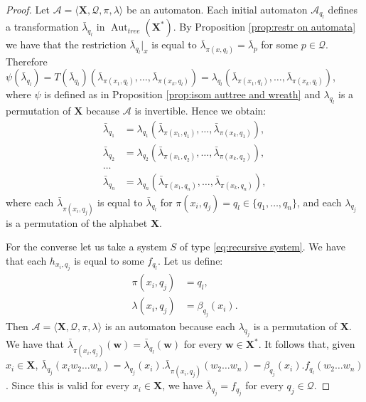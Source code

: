 \documentclass[mat1]{fmfdeloTS2.0}
\newcommand{\word}{\mathbf}				%
\newcommand{\abece}{\mathbf{X}}			%
\newcommand{\fslovar}{\mathbf{X^*}}		%
\newcommand{\auto}{\mathcal}			%
\newcommand{\QQ}{\mathcal{Q}}			%
\newcommand{\LAMBDA}{\bar{\lambda}}			%
\DeclareMathOperator{\aut}{\mathrm{Aut}}		%
\begin{document}
\begin{proof}
Let $\auto{A}=\langle\abece,\QQ,\pi,\lambda\rangle$ be an automaton. Each initial automaton $\auto{A}_{q_l}$ defines a transformation $\LAMBDA_{q_l}$ in $\aut_{tree}(\fslovar)$. By Proposition \autoref{prop:restr on automata} we have that the restriction $\LAMBDA_{q_l}|_x$ is equal to $\LAMBDA_{\pi(x,q_l)}=\LAMBDA_p$ for some $p\in\QQ$. Therefore $\psi(\LAMBDA_{q_l})=T(\LAMBDA_{q_l})(\LAMBDA_{\pi(x_1,q_l)},\ldots,\LAMBDA_{\pi(x_k,q_l)})=\lambda_{q_l}(\LAMBDA_{\pi(x_1,q_l)},\ldots,\LAMBDA_{\pi(x_k,q_l)})$, where $\psi$ is defined as in Proposition \autoref{prop:isom auttree and wreath} and $\lambda_{q_l}$ is a permutation of $\abece$ because $\auto{A}$ is invertible. Hence we obtain:
\begin{equation}\label{eq:auto wreath}
\begin{split}
\LAMBDA_{q_1}&=\lambda_{q_1}(\LAMBDA_{\pi(x_1,q_1)},\ldots,\LAMBDA_{\pi(x_k,q_1)}),\\
\LAMBDA_{q_2}&=\lambda_{q_2}(\LAMBDA_{\pi(x_1,q_2)},\ldots,\LAMBDA_{\pi(x_k,q_2)}),\\
\ldots\\
\LAMBDA_{q_n}&=\lambda_{q_n}(\LAMBDA_{\pi(x_1,q_n)},\ldots,\LAMBDA_{\pi(x_k,q_n)}),
\end{split}
\end{equation}
where each $\LAMBDA_{\pi(x_i,q_j)}$ is equal to $\LAMBDA_{q_l}$ for $\pi(x_i,q_j)=q_l\in\{q_1,\ldots,q_n\}$, and each $\lambda_{q_j}$ is a permutation of the alphabet $\abece$. 

For the converse let us take a system $S$ of type \eqref{eq:recursive system}. We have that each $h_{x_i,q_j}$ is equal to some $f_{q_l}$. Let us define:
\begin{equation*}
\begin{split}
\pi(x_i,q_j)&=q_l,\\
\lambda(x_i,q_j)&=\beta_{q_j}(x_i).
\end{split}
\end{equation*}
Then $\auto{A}=\langle\abece,\QQ,\pi,\lambda\rangle$ is an automaton because each $\lambda_{q_j}$ is a permutation of $\abece$. We have that $\LAMBDA_{\pi(x_i,q_j)}(\word{w})=\LAMBDA_{q_l}(\word{w})$ for every $\word{w}\in\fslovar$. It follows that, given $x_i\in\abece$, $\LAMBDA_{q_j}(x_iw_2\ldots w_n)=\lambda_{q_j}(x_i).\LAMBDA_{\pi(x_i,q_j)}(w_2\ldots w_n)=\beta_{q_j}(x_i).f_{q_l}(w_2\ldots w_n)$. Since this is valid for every $x_i\in\abece$, we have $\LAMBDA_{q_j}=f_{q_j}$ for every $q_j\in\QQ$.
\end{proof}
\end{document}
